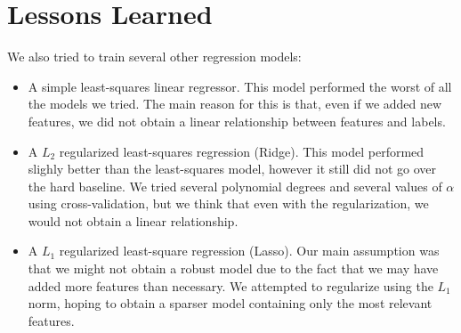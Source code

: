 \documentclass[a4paper, 11pt]{article}
\begin{document}
\section{Lessons Learned}
We also tried to train several other regression models:
\begin{itemize}
    \item A simple least-squares linear regressor. This model performed the worst of all the models we tried. The main reason for this is that, even if we added new features, we did not obtain a linear relationship between features and labels. 
    \item A $L_2$ regularized least-squares regression (Ridge). This model performed slighly better than the least-squares model, however it still did not go over the hard baseline. We tried several polynomial degrees and several values of $\alpha$ using cross-validation, but we think that even with the regularization, we would not obtain a linear relationship.
    \item A $L_1$ regularized least-square regression (Lasso). Our main assumption was that we might not obtain a robust model due to the fact that we may have added more features than necessary. We attempted to regularize using the $L_1$ norm, hoping to obtain a sparser model containing only the most relevant features.
\end{itemize}
\end{document}

